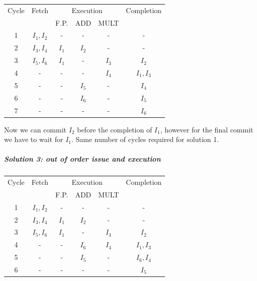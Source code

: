 \begin{center}
  \begin{tabular}{|c|c|c|c|c|c|}
    \hline
    Cycle&    Fetch       &\multicolumn{3}{|c|}{Execution}  &   Completion  \\
    &       &     F.P.  & ADD     & MULT  &               \\ \hline \hline
    1&    $I_1, I_2$&       -&    -&    -&      -\\
    2&    $I_3, I_4$&       $I_1$&  $I_2$&  -&      -\\
    3&    $I_5, I_6$&       $I_1$&  -&    $I_3$&      $I_2$\\
    4&      -&          -&    -&    $I_4$&      $I_1,I_3$\\
    5&      -&          -&    $I_5$&    -&      $I_4$\\
    6&      -&          -&    $I_6$&    -&      $I_5$\\
    7&      -&          -&    -&      -&      $I_6$\\
    \hline
  \end{tabular}
\end{center}


Now we can commit $I_2$ before the completion of $I_1$, however for the final commit we have to wait for $I_1$. Same number of cycles required for solution 1.

\subparagraph{Solution 3: out of order issue and execution}

\begin{center}
\begin{tabular}{|c|c|c|c|c|c|}
  \hline
  Cycle&    Fetch       &\multicolumn{3}{|c|}{Execution}  &   Completion  \\
  &       &     F.P.  & ADD     & MULT  &               \\ \hline \hline
  1&    $I_1, I_2$&    -    & -   & - &         -     \\
  2&    $I_3,I_4$&        $I_1$&  $I_2$&  -&            -     \\
  3&    $I_5,I_6$&        $I_1$&  -&    $I_3$&          $I_2$   \\
  4&      -&          -&    $I_6$&  $I_4$&          $I_1, I_3$  \\
  5&      -&          -&    $I_5$&  -&            $I_6, I_4$  \\
  6&      -&          -&    -&    -&            $I_5$   \\
  \hline
\end{tabular}
\end{center}

